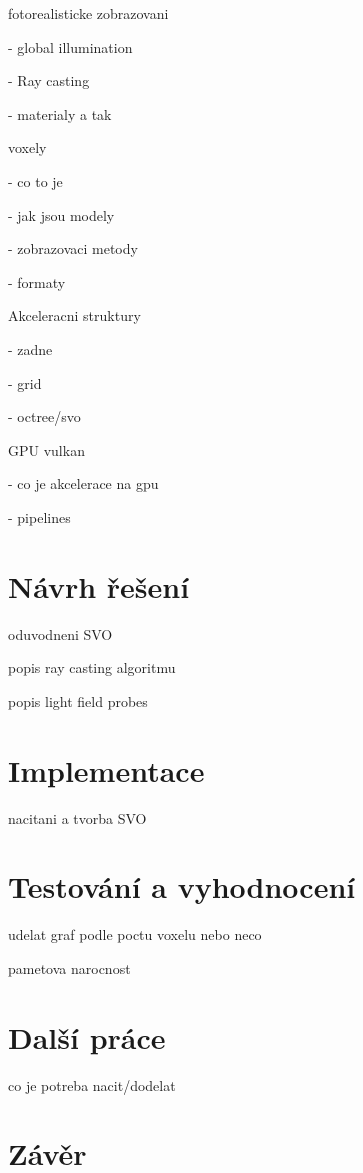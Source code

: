 fotorealisticke zobrazovani

 - global illumination

 - Ray casting
 
 - materialy a tak

voxely 

 - co to je
 
 - jak jsou modely
 
 - zobrazovaci metody
 
 - formaty

Akceleracni struktury

 - zadne
 
 - grid
 
 - octree/svo
 
GPU vulkan

 - co je akcelerace na gpu

 - pipelines

\chapter{Návrh řešení}
\label{navrh}
oduvodneni SVO

popis ray casting algoritmu

popis light field probes

\chapter{Implementace}
\label{implementace}
nacitani a tvorba SVO


\chapter{Testování a vyhodnocení}
\label{testovani}
udelat graf podle poctu voxelu nebo neco

pametova narocnost

\chapter{Další práce}
\label{dalsi_prace}
co je potreba nacit/dodelat


\chapter{Závěr}
\label{zaver}




